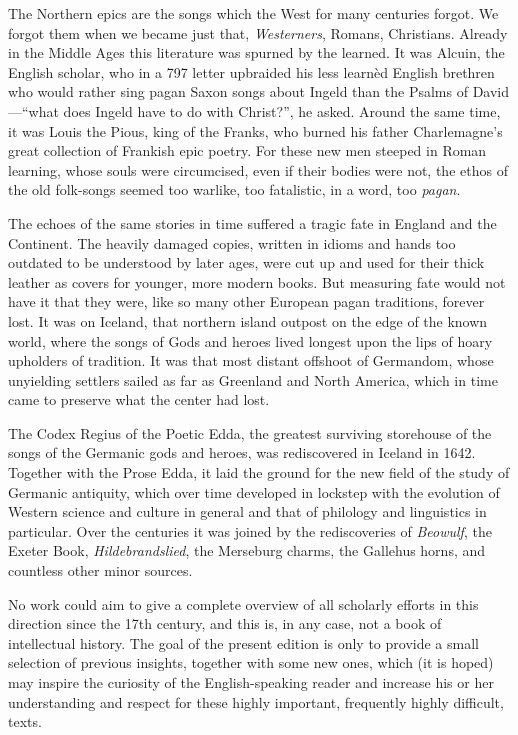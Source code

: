 The Northern epics are the songs which the West for many centuries forgot.  We forgot them when we became just that, \emph{West\-erners}, Romans, Christians.  Already in the Middle Ages this literature was spurned by the learned.   It was Alcuin, the English scholar, who in a 797 letter upbraided his less learnèd English brethren who would rather sing pagan Saxon songs about Ingeld than the Psalms of David---“what does Ingeld have to do with Christ?”, he asked.  Around the same time, it was Louis the Pious, king of the Franks, who burned his father Charlemagne’s great collection of Frankish epic poetry.  For these new men steeped in Roman learning, whose souls were circumcised, even if their bodies were not, the ethos of the old folk-songs seemed too warlike, too fatalistic, in a word, too \emph{pagan}.

The echoes of the same stories in time suffered a tragic fate in England and the Continent.  The heavily damaged copies, written in idioms and hands too outdated to be understood by later ages, were cut up and used for their thick leather as covers for younger, more modern books.  But measuring fate would not have it that they were, like so many other European pagan traditions, forever lost.  It was on Iceland, that northern island outpost on the edge of the known world, where the songs of Gods and heroes lived longest upon the lips of hoary upholders of tradition.  It was that most distant offshoot of Germandom, whose unyielding settlers sailed as far as Greenland and North America, which in time came to preserve what the center had lost.

The Codex Regius of the Poetic Edda, the greatest surviving storehouse of the songs of the Germanic gods and heroes, was rediscovered in Iceland in 1642.  Together with the Prose Edda, it laid the ground for the new field of the study of Germanic antiquity, which over time developed in lockstep with the evolution of Western science and culture in general and that of philology and linguistics in particular.  Over the centuries it was joined by the rediscoveries of \emph{Beowulf}, the Exeter Book, \emph{Hildebrandslied}, the Merseburg charms, the Gallehus horns, and countless other minor sources.

No work could aim to give a complete overview of all scholarly efforts in this direction since the 17th century, and this is, in any case, not a book of intellectual history.  The goal of the present edition is only to provide a small selection of previous insights, together with some new ones, which (it is hoped) may inspire the curiosity of the English-speaking reader and increase his or her understanding and respect for these highly important, frequently highly difficult, texts.


